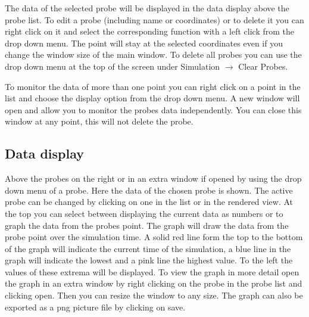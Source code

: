 \documentclass[paper=a4]{proc}
\begin{document}
		The data of the selected probe will be displayed in the data display above the probe list. To edit a probe (including name or coordinates) or to delete it you can right click on it and select the corresponding function with a left click from the drop down menu. The point will stay at the selected coordinates even if you change the window size of the main window. To delete all probes you can use the drop down menu at the top of the screen under Simulation $\rightarrow$ Clear Probes.
		
		To monitor the data of more than one point you can right click on a point in the list and choose the display option from the drop down menu. A new window will open and allow you to monitor the probes data independently. You can close this window at any point, this will not delete the probe.
		
		\subsection{Data display}
		Above the probes on the right or in an extra window if opened by using the drop down menu of a probe. Here the data of the chosen probe is shown. The active probe can be changed by clicking on one in the list or in the rendered view. At the top you can select between displaying the current data as numbers or to graph the data from the probes point. The graph will draw the data from the probe point over the simulation time. A solid red line form the top to the bottom of the graph will indicate the current time of the simulation, a blue line in the graph will indicate the lowest and a pink line the highest value. To the left the values of these extrema will be displayed. To view the graph in more detail open the graph in an extra window by right clicking on the probe in the probe list and clicking open. Then you can resize the window to any size. The graph can also be exported as a png picture file by clicking on save.
\end{document}
